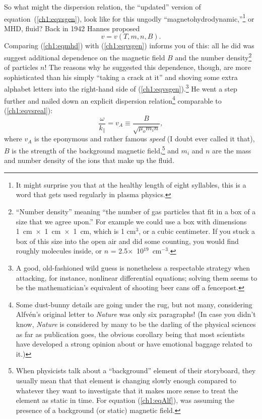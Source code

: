 So what might the dispersion relation, the ``updated'' version of
equation~(\ref{ch1:eqvsgen}), look like for this ungodly
``magnetohydrodynamic,''\footnote{It might surprise you that at the healthy
  length of eight syllables, this is a word that gets used regularly in plasma
  physics.} or MHD, fluid? Back in 1942 Hannes \Alf proposed
\begin{equation}
  \label{ch1:eqmhd}
  v = v ( T, m, n, B).
\end{equation}
Comparing (\ref{ch1:eqmhd}) with (\ref{ch1:eqvsgen}) informs you of this: all he
did was suggest additional dependence on the magnetic field $B$ and the number
density\footnote{``Number density'' meaning ``the number of gas particles that
  fit in a box of a size that we agree upon.'' For example we could use a box
  with dimensions 1~cm~$\times$~1~cm~$\times$~1~cm, which is 1 cm$^3$, or a
  cubic centimeter. If you stuck a box of this size into the open air and did
  some counting, you would find roughly 
  molecules inside, or $n$ = 2.5$\times$~10$^{19}$~cm$^{-3}$.} of particles $n$!
The reasons why he suggested this dependence, though, are more sophisticated
than his simply ``taking a crack at it'' and shoving some extra alphabet letters
into the right-hand side of (\ref{ch1:eqvsgen}).\footnote{A good, old-fashioned
  wild guess is nonetheless a respectable strategy when attacking, for instance,
  nonlinear differential equations; solving them seems to be the mathematician's
  equivalent of shooting beer cans off a fencepost.} He went a step further and
nailed down an explicit dispersion relation\footnote{Some dust-bunny details are
  going under the rug, but not many, considering Alfv\'{e}n's original letter to
  \textsl{Nature} was only six paragraphs! (In case you didn't know,
  \textsl{Nature} is considered by many to be the darling of the physical
  sciences as far as publication goes, the obvious corollary being that most
  scientists have developed a strong opinion about or have emotional baggage
  related to it.)} comparable to (\ref{ch1:eqvsreal}):
\begin{equation}
  \label{ch1:eqAlf}
  \dfrac{\omega}{k_\parallel} = v_A \equiv \frac{B}{\sqrt{\mu_o m_i n}},
\end{equation}
where $v_A$ is the eponymous and rather famous \textsl{\Alf speed} (I doubt \Alf
ever called it that), $B$ is the strength of the background magnetic
field,\footnote{When physicists talk about a ``background'' element of their
  storyboard, they usually mean that that element is changing slowly enough
  compared to whatever they want to investigate that it makes more sense to
  treat the element as static in time. For equation (\ref{ch1:eqAlf}), \Alf was
  assuming the presence of a background (or static) magnetic field.} and $m_i$
and $n$ are the mass and number density of the ions that make up the fluid.

